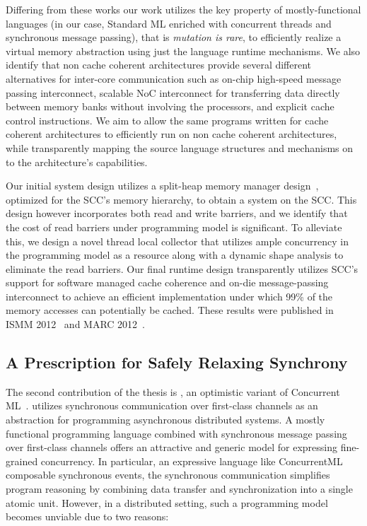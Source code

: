 Differing from these works our work utilizes the key property of
mostly-functional languages (in our case, Standard ML enriched with concurrent
threads and synchronous message passing), that is \emph{mutation is rare}, to
efficiently realize a virtual memory abstraction using just the language runtime
mechanisms. We also identify that non cache coherent architectures provide
several different alternatives for inter-core communication such as on-chip
high-speed message passing interconnect, scalable NoC interconnect for
transferring data directly between memory banks without involving the
processors, and explicit cache control instructions. We aim to allow the same
programs written for cache coherent architectures to efficiently run on non
cache coherent architectures, while transparently mapping the source language
structures and mechanisms on to the architecture's capabilities.

Our initial system design utilizes a split-heap memory manager
design~\cite{Marlow11,Auhagen11,Anderson10}, optimized for the SCC's memory
hierarchy, to obtain a \MM system on the SCC. This design however incorporates
both read and write barriers, and we identify that the cost of read barriers
under \MM programming model is significant. To alleviate this, we design a
novel thread local collector that utilizes ample concurrency in the programming
model as a resource along with a dynamic shape analysis to eliminate the read
barriers. Our final runtime design transparently utilizes SCC's support for
software managed cache coherence and on-die message-passing interconnect to
achieve an efficient implementation under which 99\% of the memory accesses can
potentially be cached. These results were published in ISMM 2012~\cite{mmgc}
and MARC 2012~\cite{marc12}.

\subsection{A Prescription for Safely Relaxing Synchrony}

The second contribution of the thesis is \rxcml, an optimistic variant of
Concurrent ML~\cite{Reppy99}. \rxcml utilizes synchronous communication over
first-class channels as an abstraction for programming asynchronous distributed
systems. A mostly functional programming language combined with synchronous
message passing over first-class channels offers an attractive and generic
model for expressing fine-grained concurrency. In particular, an expressive
language like ConcurrentML~\cite{Reppy99} composable synchronous events, the
synchronous communication simplifies program reasoning by combining data
transfer and synchronization into a single atomic unit. However, in a
distributed setting, such a programming model becomes unviable due to two
reasons:

